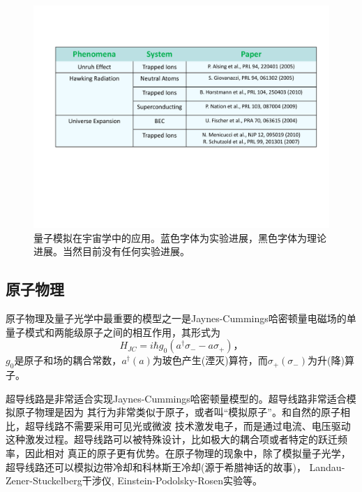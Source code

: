 \begin{figure}[htbp]
            \begin{center}
              \includegraphics[width= 0.8\columnwidth]{figures/cosmic.pdf}
              \caption{量子模拟在宇宙学中的应用。蓝色字体为实验进展，黑色字体为理论进展。当然目前没有任何实验进展。
              }
              \label{cosmic}
            \end{center}
\end{figure}

 \subsection{原子物理}

原子物理及量子光学中最重要的模型之一是Jaynes-Cummings哈密顿量电磁场的单量子模式和两能级原子之间的相互作用，其形式为
\begin{equation}\label{supersim}
 H_{JC} = i\hbar g_0(a^{\dagger}\sigma_{-}-a\sigma_{+})，
\end{equation}
$g_0$是原子和场的耦合常数，$a^{\dagger}(a)$为玻色产生(湮灭)算符，而$\sigma_{+}(\sigma_{-})$为升(降)算子。

超导线路是非常适合实现Jaynes-Cummings哈密顿量模型的\cite{atomsim1}。超导线路非常适合模拟原子物理是因为
其行为非常类似于原子，或者叫“模拟原子”。和自然的原子相比，超导线路不需要采用可见光或微波
技术激发电子，而是通过电流、电压驱动这种激发过程。超导线路可以被特殊设计，比如极大的耦合项或者特定的跃迁频率，因此相对
真正的原子更有优势。在原子物理的现象中，除了模拟量子光学\cite{supersim5}，超导线路还可以模拟边带冷却和科林斯王冷却(源于希腊神话的故事)\cite{atomsim2}，
Landau-Zener-Stuckelberg干涉仪\cite{atomsim3}, Einstein-Podolsky-Rosen实验\cite{super2}等。

